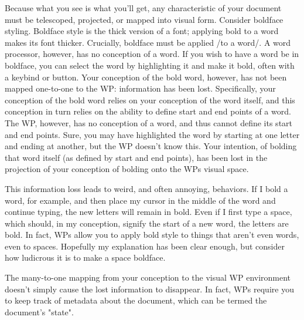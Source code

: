 \documentclass[12pt]{article}
\begin{document}
Because what you see is what you'll get, any characteristic of your document must be telescoped, projected, or mapped into visual form. Consider boldface styling. Boldface style is the thick version of a font; applying bold to a word makes its font thicker. Crucially, boldface must be applied /to a word/. A word processor, however, has no conception of a word. If you wish to have a word be in boldface, you can select the word by highlighting it and make it bold, often with a keybind or button. Your conception of the bold word, however, has not been mapped one-to-one to the WP: information has been lost. Specifically, your conception of the bold word relies on your conception of the word itself, and this conception in turn relies on the ability to define start and end points of a word. The WP, however, has no conception of a word, and thus cannot define its start and end points. Sure, you may have highlighted the word by starting at one letter and ending at another, but the WP doesn't know this. Your intention, of bolding that word itself (as defined by start and end points), has been lost in the projection of your conception of bolding onto the WPs visual space.

This information loss leads to weird, and often annoying, behaviors. If I bold a word, for example, and then place my cursor in the middle of the word and continue typing, the new letters will remain in bold. Even if I first type a space, which should, in my conception, signify the start of a new word, the letters are bold. In fact, WPs allow you to apply bold style to things that aren't even words, even to spaces. Hopefully my explanation has been clear enough, but consider how ludicrous it is to make a space boldface.

The many-to-one mapping from your conception to the visual WP environment doesn't simply cause the lost information to disappear. In fact, WPs require you to keep track of metadata about the document, which can be termed the document's "state".

\end{document}
